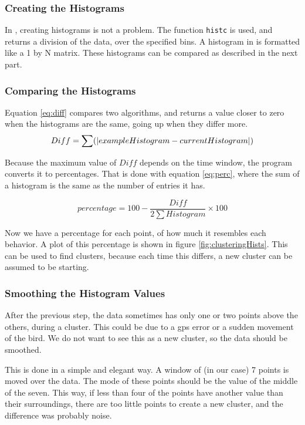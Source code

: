 \subsubsection{Creating the Histograms}
In \matlab, creating histograms is not a problem. The function \texttt{histc} is
used, and returns a division of the data, over the specified bins. A histogram
in \matlab is formatted like a 1 by N matrix. These
histograms can be compared as described in the next part.

\subsubsection{Comparing the Histograms}
Equation \ref{eq:diff} compares two algorithms, and returns a value closer to
zero when the histograms are the same, going up when they differ more.
\begin{equation}
\label{eq:diff}
Diff = \sum ( \left| exampleHistogram - currentHistogram \right| ) \vspace{10pt}
\end{equation}
 
Because the maximum value of $Diff$ depends on the time window, the program converts
it to percentages. That is done with equation \ref{eq:perc}, where the sum of a
histogram is the same as the number of entries it has.

\begin{equation}
\label{eq:perc}
percentage = 100 - \frac{Diff}{2 \sum Histogram} \times 100
\end{equation}

Now we have a percentage for each point, of how much it resembles each behavior.
A plot of this percentage is shown in figure
\ref{fig:clusteringHists}.
This can be used to find clusters, because each time this differs, a new
cluster can be assumed to be starting.

\subsubsection{Smoothing the Histogram Values}
After the previous step, the data sometimes has only one or two points above the
others, during a cluster. This could be due to a gps error or a sudden movement
of the bird. We do not want to see this as a new cluster, so the data should be
smoothed.

This is done in a simple and elegant way. A window of (in our case) 7 points is
moved over the data. The mode of these points should be the value of the middle
of the seven. This way, if less than four of the points have another value than
their surroundings, there are too little points to create a new cluster, and the
difference was probably noise. 

